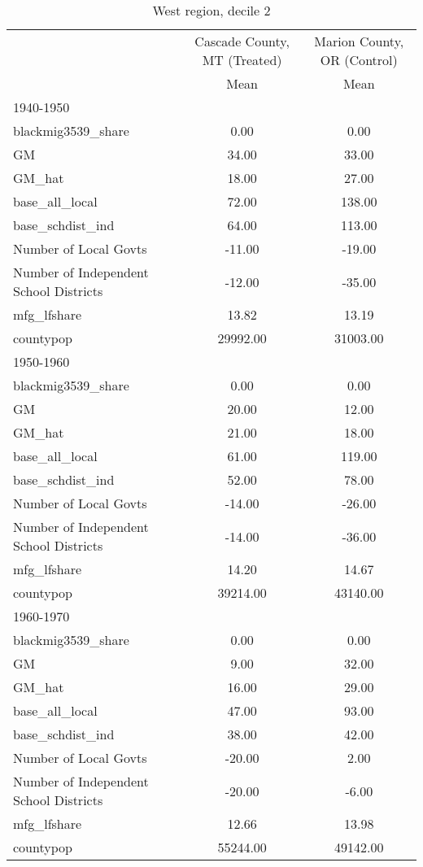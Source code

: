 \begin{table}[htbp]\centering
\def\sym#1{\ifmmode^{#1}\else\(^{#1}\)\fi}
\caption{West region, decile 2 \label{tab1}}
\begin{tabular}{l*{2}{c}}
\toprule
                    &\multicolumn{1}{c}{Cascade County, MT (Treated)}&\multicolumn{1}{c}{Marion County, OR (Control)}\\
                    &        Mean&        Mean\\
\midrule
1940-1950           &            &            \\
blackmig3539\_share  &        0.00&        0.00\\
GM                  &       34.00&       33.00\\
GM\_hat              &       18.00&       27.00\\
base\_all\_local      &       72.00&      138.00\\
base\_schdist\_ind    &       64.00&      113.00\\
Number of Local Govts&      -11.00&      -19.00\\
Number of Independent School Districts&      -12.00&      -35.00\\
mfg\_lfshare         &       13.82&       13.19\\
countypop           &    29992.00&    31003.00\\
\midrule
1950-1960           &            &            \\
blackmig3539\_share  &        0.00&        0.00\\
GM                  &       20.00&       12.00\\
GM\_hat              &       21.00&       18.00\\
base\_all\_local      &       61.00&      119.00\\
base\_schdist\_ind    &       52.00&       78.00\\
Number of Local Govts&      -14.00&      -26.00\\
Number of Independent School Districts&      -14.00&      -36.00\\
mfg\_lfshare         &       14.20&       14.67\\
countypop           &    39214.00&    43140.00\\
\midrule
1960-1970           &            &            \\
blackmig3539\_share  &        0.00&        0.00\\
GM                  &        9.00&       32.00\\
GM\_hat              &       16.00&       29.00\\
base\_all\_local      &       47.00&       93.00\\
base\_schdist\_ind    &       38.00&       42.00\\
Number of Local Govts&      -20.00&        2.00\\
Number of Independent School Districts&      -20.00&       -6.00\\
mfg\_lfshare         &       12.66&       13.98\\
countypop           &    55244.00&    49142.00\\
\bottomrule
\end{tabular}
\end{table}
